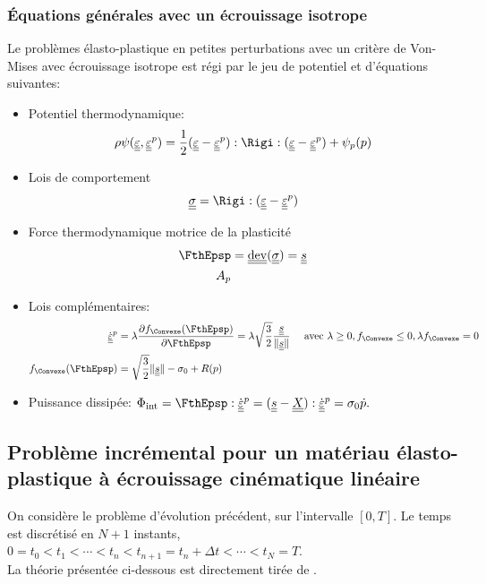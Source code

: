 \documentclass[10pt]{book}
\begin{document}
\begin{appendices}
\subsubsection{Équations générales avec un écrouissage isotrope}
Le problèmes élasto-plastique en petites perturbations avec un critère de Von-Mises avec écrouissage isotrope est régi par le jeu de potentiel et d'équations suivantes:
\begin{itemize}
\item Potentiel thermodynamique:
$$\rho \eHelm(\DefoHPP,\EpsP)=\frac{1}{2}(\DefoHPP-\EpsP):\Rigi:(\DefoHPP-\EpsP)+\eHelm_{p}(p)$$
\item Lois de comportement
$$\SC =\Rigi:(\DefoHPP-\EpsP)$$
\item Force thermodynamique motrice de la plasticité
$$\begin{aligned}
\FthEpsp&=\dev(\SC)=\devia\\
A_{p}
\end{aligned}$$
\item Lois complémentaires:
$$\begin{aligned}
\dot{\DefoHPP}^{p}&=\lambda\frac{\partial \FChargeConvexe(\FthEpsp)}{\partial \FthEpsp}=\lambda\sqrt{\frac{3}{2}}\frac{\devia}{\Vert \devia\Vert} \quad \avec \lambda\geq 0, \FChargeConvexe\leq 0, \lambda\FChargeConvexe=0\\
\FChargeConvexe(\FthEpsp)&=\sqrt{\frac{3}{2}}\Vert \devia\Vert-\sigma_{0}+R(p)
\end{aligned}$$
\item Puissance dissipée: $\dint=\FthEpsp:\dot{\DefoHPP}^{p}=(\devia-\TenTranslatDom):\dot{\DefoHPP}^{p}= \sigma_{0}\dot{p}.$
\end{itemize}
\subsection{Problème incrémental pour un matériau élasto-plastique à écrouissage cinématique linéaire}
On considère le problème d'évolution précédent, sur l'intervalle $[0,T]$. Le temps est discrétisé en $N+1$ instants, $0=t_{0}<t_{1} <\cdots<t_{n}<t_{n+1}=t_{n}+\Delta t<\cdots<t_{N}=T.$\\

La théorie présentée ci-dessous est directement tirée de \cite{maitournam2017materiaux}.\\


\end{appendices}
\end{document}
